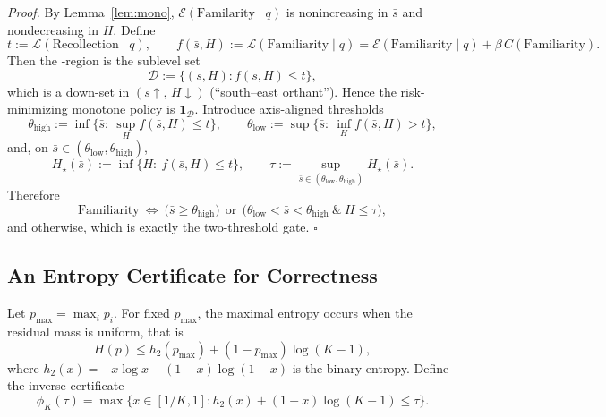 \noindent\emph{Proof.}
By Lemma~\ref{lem:mono}, $\mathcal{E}(\text{Familarity}\mid q)$ is nonincreasing in $\bar s$ and nondecreasing in $H$.
Define
\begin{equation}
t := \mathcal{L}(\text{Recollection}\mid q), \qquad
f(\bar s,H) := \mathcal{L}(\text{Familiarity}\mid q) = \mathcal{E}(\text{Familiarity}\mid q)+\beta\,C(\text{Familiarity}).
\end{equation}
Then the -region is the sublevel set
\begin{equation}
\mathcal{D} := \{(\bar s,H): f(\bar s,H)\le t\},
\end{equation}
which is a down-set in $(\bar s\uparrow,\, H\downarrow)$ (``south–east orthant'').
Hence the risk-minimizing monotone policy is $\mathbf{1}_{\mathcal{D}}$.
Introduce axis-aligned thresholds
\begin{equation}
\theta_{\mathrm{high}} := \inf\{\bar s:\ \sup_H f(\bar s,H)\le t\}, \qquad
\theta_{\mathrm{low}}  := \sup\{\bar s:\ \inf_H f(\bar s,H)> t\},
\end{equation}
and, on $\bar s\in(\theta_{\mathrm{low}},\theta_{\mathrm{high}})$,
\begin{equation}
H_\star(\bar s) := \inf\{H:\ f(\bar s,H)\le t\}, \qquad
\tau := \sup_{\bar s\in(\theta_{\mathrm{low}},\theta_{\mathrm{high}})} H_\star(\bar s).
\end{equation}
Therefore
\begin{equation}
\text{Familiarity}\ \Longleftrightarrow\ \big(\bar s\ge \theta_{\mathrm{high}}\big)\ \ \text{or}\ \ \big(\theta_{\mathrm{low}}<\bar s<\theta_{\mathrm{high}}\ \&\ H\le \tau\big),
\end{equation}
and  otherwise, which is exactly the two-threshold gate. \hfill$\square$

\subsection{An Entropy Certificate for Correctness}
Let $p_{\max}=\max_i p_i$.
For fixed $p_{\max}$, the maximal entropy occurs when the residual mass is uniform, that is
\begin{equation}
H(p)\le h_2(p_{\max})+(1-p_{\max})\log(K-1),
\label{eq:entropy-upper}
\end{equation}
where $h_2(x)=-x\log x-(1-x)\log(1-x)$ is the binary entropy.
Define the inverse certificate
\begin{equation}
\phi_K(\tau)=\max\{x\in[1/K,1]: h_2(x)+(1-x)\log(K-1)\le \tau\}.
\end{equation}

